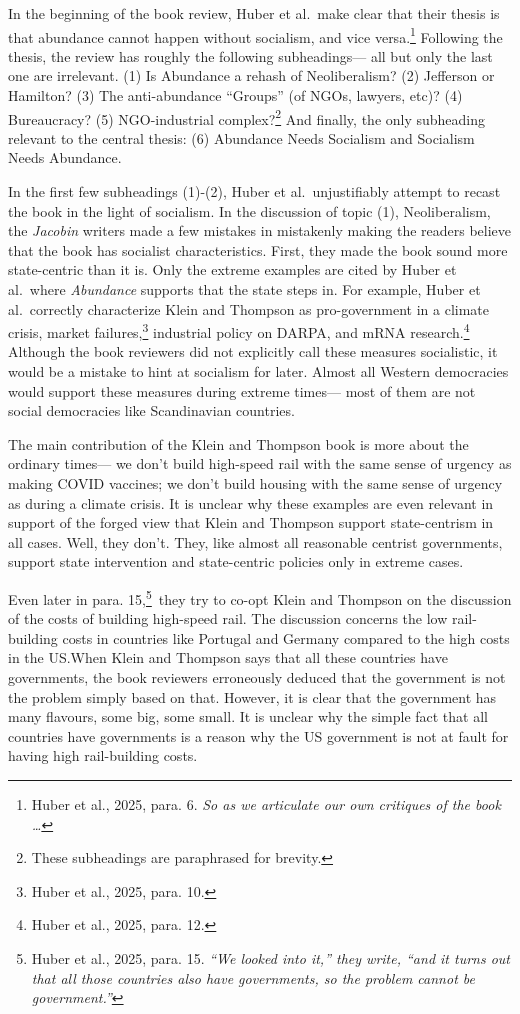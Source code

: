 \documentclass[12pt]{article}
\begin{document}
In the beginning of the book review, Huber et al.\ make clear that their thesis is that abundance cannot happen without socialism, and vice versa.\footnote{Huber et al., 2025, para. 6. \emph{So as we articulate our own critiques of the book \dots}} Following the thesis, the review has roughly the following subheadings--- all but only the last one are irrelevant. (1) Is Abundance a rehash of Neoliberalism? (2) Jefferson or Hamilton? (3) The anti-abundance ``Groups'' (of NGOs, lawyers, etc)? (4) Bureaucracy? (5) NGO-industrial complex?\footnote{These subheadings are paraphrased for brevity.} And finally, the only subheading relevant to the central thesis: (6) Abundance Needs Socialism and Socialism Needs Abundance.

In the first few subheadings (1)-(2), Huber et al.\ unjustifiably attempt to recast the book in the light of socialism. In the discussion of topic (1), Neoliberalism, the \emph{Jacobin} writers made a few mistakes in mistakenly making the readers believe that the book has socialist characteristics. First, they made the book sound more state-centric than it is. Only the extreme examples are cited by Huber et al.\ where \emph{Abundance} supports that the state steps in. For example, Huber et al.\ correctly characterize Klein and Thompson as pro-government in a climate crisis, market failures,\footnote{Huber et al., 2025, para. 10.} industrial policy on DARPA, and mRNA research.\footnote{Huber et al., 2025, para. 12.} Although the book reviewers did not explicitly call these measures socialistic, it would be a mistake to hint at socialism for later. Almost all Western democracies would support these measures during extreme times--- most of them are not social democracies like Scandinavian countries. 

The main contribution of the Klein and Thompson book is more about the ordinary times--- we don't build high-speed rail with the same sense of urgency as making COVID vaccines; we don't build housing with the same sense of urgency as during a climate crisis. It is unclear why these examples are even relevant in support of the forged view that Klein and Thompson support state-centrism in all cases. Well, they don't. They, like almost all reasonable centrist governments, support state intervention and state-centric policies only in extreme cases.

Even later in para. 15,\footnote{Huber et al., 2025, para. 15. \emph{``We looked into it,'' they write, ``and it turns out that all those countries also have governments, so the problem cannot be government.''}}\ they try to co-opt Klein and Thompson on the discussion of the costs of building high-speed rail. The discussion concerns the low rail-building costs in countries like Portugal and Germany compared to the high costs in the US.\@ When Klein and Thompson says that all these countries have governments, the book reviewers erroneously deduced that the government is not the problem simply based on that. However, it is clear that the government has many flavours, some big, some small. It is unclear why the simple fact that all countries have governments is a reason why the US government is not at fault for having high rail-building costs.
\end{document}

